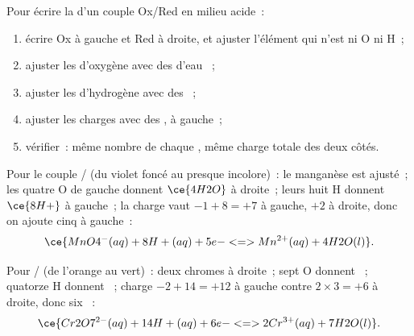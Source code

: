 \begin{method}\label{met:g11:redox:balance}
Pour écrire la  d'un couple Ox/Red en milieu acide~:
\begin{enumerate}
  \item écrire Ox à gauche et Red à droite, et ajuster l'élément qui
        n'est ni O ni H~;
  \item ajuster les  d'oxygène avec des  d'eau ~;
  \item ajuster les  d'hydrogène avec des  ~;
  \item ajuster les charges avec des  , à gauche~;
  \item vérifier~: même nombre de chaque , même charge totale des
        deux côtés.
\end{enumerate}
\end{method}

\begin{example}\label{ex:g11:redox:permanganate}
Pour le couple / (du violet foncé au presque
incolore)~: le manganèse est ajusté~; les quatre O de gauche donnent
$\ce{4H2O}$ à droite~; leurs huit H donnent $\ce{8H+}$ à gauche~; la
charge vaut $-1 + 8 = +7$ à gauche, $+2$ à droite, donc on ajoute cinq
 à gauche~:
\[
  \ce{MnO4^-(aq) + 8H+(aq) + 5e- <=> Mn^{2+}(aq) + 4H2O(l)}.
\]
\end{example}

\begin{example}\label{ex:g11:redox:dichromate}
Pour / (de l'orange au vert)~: deux chromes à
droite~; sept O donnent ~; quatorze H donnent ~;
charge $-2 + 14 = +12$ à gauche contre $2 \times 3 = +6$ à droite, donc
six ~:
\[
  \ce{Cr2O7^{2-}(aq) + 14H+(aq) + 6e- <=> 2Cr^{3+}(aq) + 7H2O(l)}.
\]
\end{example}

